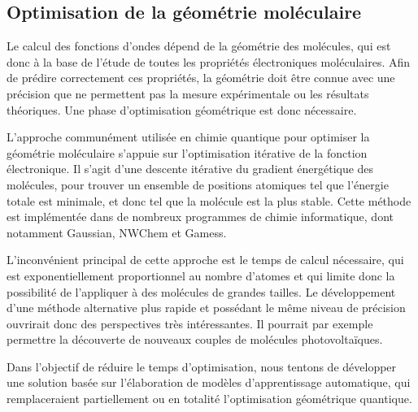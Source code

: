 \subsection{Optimisation de la géométrie moléculaire}

\par Le calcul des fonctions d'ondes dépend de la géométrie des molécules, qui est donc à la base de l'étude de toutes les propriétés électroniques moléculaires. Afin de prédire correctement ces propriétés, la géométrie doit être connue avec une précision que ne permettent pas la mesure expérimentale ou les résultats théoriques. Une phase d'optimisation géométrique est donc nécessaire.\\

\par L'approche communément utilisée en chimie quantique pour optimiser la géométrie moléculaire s'appuie sur l'optimisation itérative de la fonction électronique. Il s'agit d'une descente itérative du gradient énergétique des molécules, pour trouver un ensemble de positions atomiques tel que l'énergie totale est minimale, et donc tel que la molécule est la plus stable. Cette méthode est implémentée dans de nombreux programmes de chimie informatique, dont notamment Gaussian, NWChem et Gamess.\\

		\par L'inconvénient principal de cette approche est le temps de calcul nécessaire, qui est exponentiellement proportionnel au nombre d'atomes et qui limite donc la possibilité de l'appliquer à des molécules de grandes tailles. Le développement d'une méthode alternative plus rapide et possédant le même niveau de précision ouvrirait donc des perspectives très intéressantes. Il pourrait par exemple permettre la découverte de nouveaux couples de molécules photovoltaïques.
\par Dans l'objectif de réduire le temps d'optimisation, nous tentons de développer une solution basée sur l'élaboration de modèles d'apprentissage automatique, qui remplaceraient partiellement ou en totalité l'optimisation géométrique quantique.
